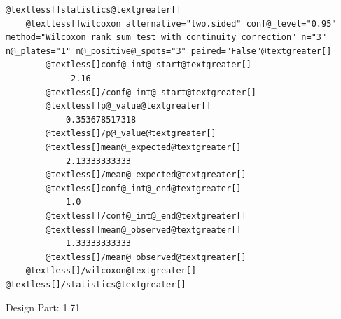 \documentclass[letterpaper,10pt,english]{sphinxmanual}
\begin{document}
\begin{fulllineitems}
\begin{fulllineitems}
\begin{Verbatim}[commandchars=@\[\]]
@textless[]statistics@textgreater[]
    @textless[]wilcoxon alternative="two.sided" conf@_level="0.95" method="Wilcoxon rank sum test with continuity correction" n="3" n@_plates="1" n@_positive@_spots="3" paired="False"@textgreater[]
        @textless[]conf@_int@_start@textgreater[]
            -2.16
        @textless[]/conf@_int@_start@textgreater[]
        @textless[]p@_value@textgreater[]
            0.353678517318
        @textless[]/p@_value@textgreater[]
        @textless[]mean@_expected@textgreater[]
            2.13333333333
        @textless[]/mean@_expected@textgreater[]
        @textless[]conf@_int@_end@textgreater[]
            1.0
        @textless[]/conf@_int@_end@textgreater[]
        @textless[]mean@_observed@textgreater[]
            1.33333333333
        @textless[]/mean@_observed@textgreater[]
    @textless[]/wilcoxon@textgreater[]
@textless[]/statistics@textgreater[]
\end{Verbatim}

Design Part: 1.71

\end{fulllineitems}


\end{fulllineitems}

\end{document}
